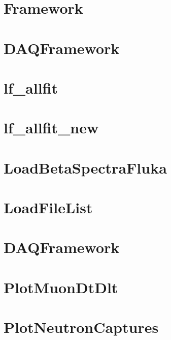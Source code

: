 \let\mypdfximage\pdfximage\def\pdfximage{\immediate\mypdfximage}\documentclass[twoside]{book}
\newcommand{\+}{\discretionary{\mbox{\scriptsize$\hookleftarrow$}}{}{}}
\begin{document}
\chapter{Framework}
\label{md_UserTools_ImportedTools_README}

\chapter{DAQFramework}
\label{md_UserTools_InactiveTools_README}

\chapter{lf\+\_\+allfit}
\label{md_UserTools_lf_allfit_README}

\chapter{lf\+\_\+allfit\+\_\+new}
\label{md_UserTools_lf_allfit_new_README}

\chapter{Load\+Beta\+Spectra\+Fluka}
\label{md_UserTools_LoadBetaSpectraFluka_README}

\chapter{Load\+File\+List}
\label{md_UserTools_LoadFileList_README}

\chapter{DAQFramework}
\label{md_UserTools_ntag_BDT_README}

\chapter{Plot\+Muon\+Dt\+Dlt}
\label{md_UserTools_PlotMuonDtDlt_README}

\chapter{Plot\+Neutron\+Captures}
\label{md_UserTools_PlotNeutronCaptures_README}

\end{document}
